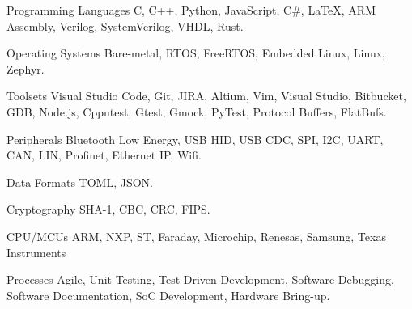 


\begin{cvskills}


\cvskill
{Programming Languages} %
{C, C++, Python, JavaScript, C\#, LaTeX, ARM Assembly, Verilog, SystemVerilog, VHDL, Rust.} %


\cvskill
{Operating Systems} %
{Bare-metal, RTOS, FreeRTOS, Embedded Linux, Linux, Zephyr.} %


\cvskill
{Toolsets} %
{Visual Studio Code, Git, JIRA, Altium, Vim, Visual Studio, Bitbucket, GDB, Node.js, Cpputest, Gtest, \newline Gmock, PyTest, Protocol Buffers, FlatBufs.} %


\cvskill
{Peripherals} %
{Bluetooth Low Energy, USB HID, USB CDC, SPI, I2C, UART, CAN, LIN, Profinet, Ethernet IP, Wifi.} %


\cvskill
{Data Formats} %
{TOML, JSON.} %


\cvskill
{Cryptography} %
{SHA-1, CBC, CRC, FIPS.} %


\cvskill
{CPU/MCUs} %
{ARM, NXP, ST, Faraday, Microchip, Renesas, Samsung, Texas Instruments} %


\cvskill
{Processes} %
{Agile, Unit Testing, Test Driven Development, Software Debugging, Software Documentation, \newline SoC Development, Hardware Bring-up.} %


\end{cvskills}